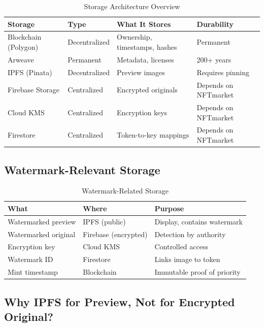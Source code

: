 \documentclass[11pt,a4paper]{article}
\begin{document}
\begin{table}[h]
\centering
\begin{tabular}{@{}L{3cm}L{2.5cm}L{3.5cm}L{3cm}@{}}
\toprule
\textbf{Storage} & \textbf{Type} & \textbf{What It Stores} & \textbf{Durability} \\
\midrule
Blockchain (Polygon) & Decentralized & Ownership, timestamps, hashes & Permanent \\
Arweave & Permanent & Metadata, licenses & 200+ years \\
IPFS (Pinata) & Decentralized & Preview images & Requires pinning \\
Firebase Storage & Centralized & Encrypted originals & Depends on NFTmarket \\
Cloud KMS & Centralized & Encryption keys & Depends on NFTmarket \\
Firestore & Centralized & Token-to-key mappings & Depends on NFTmarket \\
\bottomrule
\end{tabular}
\caption{Storage Architecture Overview}
\end{table}

\subsection{Watermark-Relevant Storage}

\begin{table}[h]
\centering
\begin{tabular}{@{}L{4cm}L{4cm}L{4cm}@{}}
\toprule
\textbf{What} & \textbf{Where} & \textbf{Purpose} \\
\midrule
Watermarked preview & IPFS (public) & Display, contains watermark \\
Watermarked original & Firebase (encrypted) & Detection by authority \\
Encryption key & Cloud KMS & Controlled access \\
Watermark ID & Firestore & Links image to token \\
Mint timestamp & Blockchain & Immutable proof of priority \\
\bottomrule
\end{tabular}
\caption{Watermark-Related Storage}
\end{table}

\subsection{Why IPFS for Preview, Not for Encrypted Original?}
\end{document}

